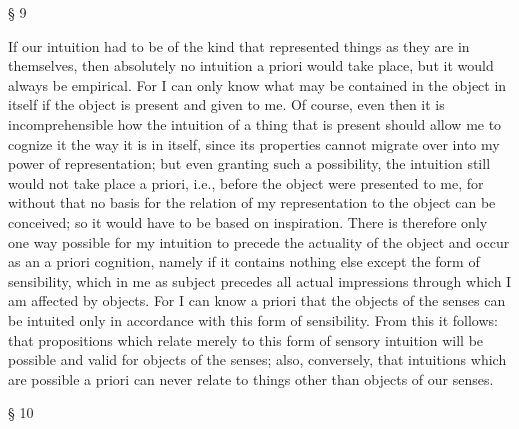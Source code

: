 § 9

If our intuition had to be of the kind that represented things as they are
in themselves, then absolutely no intuition a priori would take place, but it
would always be empirical. For I can only know what may be contained in
the object in itself if the object is present and given to me. Of course, even
then it is incomprehensible how the intuition of a thing that is present
should allow me to cognize it the way it is in itself, since its properties
cannot migrate over into my power of representation; but even granting
such a possibility, the intuition still would not take place a priori, i.e.,
before the object were presented to me, for without that no basis for
the relation of my representation to the object can be conceived; so it
would have to be based on inspiration. There is therefore only one way
possible for my intuition to precede the actuality of the object and occur
as an a priori cognition, namely if it contains nothing else except the form of
sensibility, which in me as subject precedes all actual impressions through which
I am affected by objects. For I can know a priori that the objects of the
senses can be intuited only in accordance with this form of sensibility.
From this it follows: that propositions which relate merely to this form of
sensory intuition will be possible and valid for objects of the senses; also,
conversely, that intuitions which are possible a priori can never relate to
things other than objects of our senses.

§ 10

